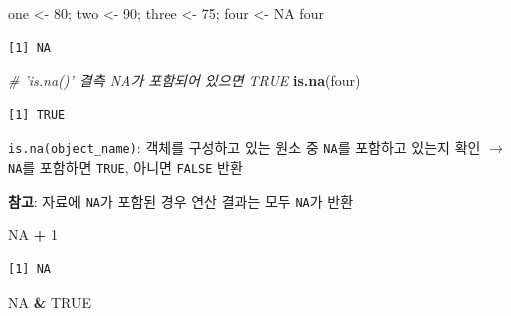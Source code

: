 \documentclass[
  11pt,
]{krantz}
\newenvironment{Shaded}{\begin{snugshade}}{\end{snugshade}}
\newcommand{\CommentTok}[1]{\textcolor[rgb]{0.37,0.37,0.37}{\textit{#1}}}
\newcommand{\DecValTok}[1]{\textcolor[rgb]{0.06,0.06,0.06}{#1}}
\newcommand{\KeywordTok}[1]{\textcolor[rgb]{0.27,0.27,0.27}{\textbf{#1}}}
\newcommand{\NormalTok}[1]{#1}
\newcommand{\OperatorTok}[1]{\textcolor[rgb]{0.43,0.43,0.43}{\textbf{#1}}}
\newcommand{\OtherTok}[1]{\textcolor[rgb]{0.37,0.37,0.37}{#1}}
\newcommand{\StringTok}[1]{\textcolor[rgb]{0.5,0.5,0.5}{#1}}
\let\BeginKnitrBlock\begin \let\EndKnitrBlock\end
\begin{document}
\footnotesize

\begin{Shaded}
\begin{Highlighting}[]
\NormalTok{one <-}\StringTok{ }\DecValTok{80}\NormalTok{; two <-}\StringTok{ }\DecValTok{90}\NormalTok{; three <-}\StringTok{ }\DecValTok{75}\NormalTok{; four <-}\StringTok{ }\OtherTok{NA}
\NormalTok{four}
\end{Highlighting}
\end{Shaded}

\begin{verbatim}
[1] NA
\end{verbatim}

\begin{Shaded}
\begin{Highlighting}[]
\CommentTok{# 'is.na()' 결측 NA가 포함되어 있으면 TRUE }
\KeywordTok{is.na}\NormalTok{(four)}
\end{Highlighting}
\end{Shaded}

\begin{verbatim}
[1] TRUE
\end{verbatim}

\normalsize

\footnotesize

\BeginKnitrBlock{rmdtip}
\texttt{is.na(object\_name)}: 객체를 구성하고 있는 원소 중 \texttt{NA}를 포함하고 있는지 확인 \(\rightarrow\) \texttt{NA}를 포함하면 \texttt{TRUE}, 아니면 \texttt{FALSE} 반환

\textbf{참고}: 자료에 \texttt{NA}가 포함된 경우 연산 결과는 모두 \texttt{NA}가 반환
\EndKnitrBlock{rmdtip}

\normalsize

\footnotesize

\begin{Shaded}
\begin{Highlighting}[]
\OtherTok{NA} \OperatorTok{+}\StringTok{ }\DecValTok{1}
\end{Highlighting}
\end{Shaded}

\begin{verbatim}
[1] NA
\end{verbatim}

\begin{Shaded}
\begin{Highlighting}[]
\OtherTok{NA} \OperatorTok{&}\StringTok{ }\OtherTok{TRUE}
\end{Highlighting}
\end{Shaded}
\end{document}
